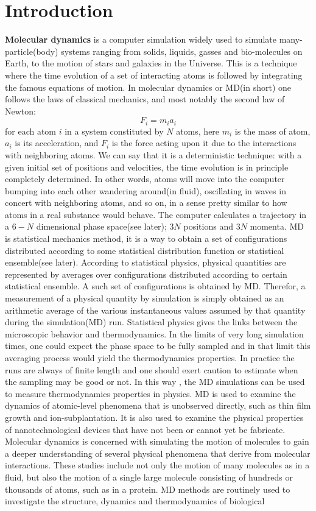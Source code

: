 \documentclass[a4paper]{article}
\begin{document}
\section{Introduction}
\textbf{Molecular dynamics} is a computer simulation widely used to simulate many-particle(body) systems ranging from solids, liquids, gasses and bio-molecules on Earth, to the motion of stars and galaxies in the Universe. This is a technique where the time evolution of a set of interacting atoms is followed by integrating the famous equations of motion. In molecular dynamics or MD(in short) one follows the laws of classical mechanics, and most notably the second law of Newton: 
\begin{equation}
F_i =m_i a_i
\end{equation}
for each atom $i$ in a system constituted by $N$ atoms, here $m_i$ is the mass of atom, $a_i$ is its acceleration, and $F_i$ is the force acting upon it due to the interactions with neighboring atoms. We can say that it is a deterministic technique: with a given initial set of positions and velocities, the time evolution is in principle completely determined. In other words, atoms will move into the computer bumping into each other wandering around(in fluid), oscillating in waves in concert with neighboring atoms, and so on, in a sense pretty similar to how atoms in a real substance would behave. The computer calculates a trajectory in a $6-N$ dimensional phase space(see later); $3N$ positions and $3N$ momenta. MD is statistical mechanics method, it is a way to obtain a set of configurations distributed according to some statistical distribution function or statistical ensemble(see later). According to statistical physics, physical quantities are represented by averages over configurations distributed according to certain statistical ensemble. A such set of configurations is obtained by MD. Therefor, a measurement of a physical quantity by simulation is simply obtained as an arithmetic average of the various instantaneous values assumed by that quantity during the simulation(MD) run. Statistical physics gives the links between the microscopic behavior and thermodynamics. In the limits of very long simulation times, one could expect the phase space to be fully sampled and in that limit this averaging process would yield the thermodynamics properties. In practice the runs are always of finite length and one should exert caution to estimate when the sampling may be good or not. In this way , the MD simulations can be used to measure thermodynamics properties in physics. MD is used to examine the dynamics of atomic-level phenomena that is unobserved directly, such as thin film growth and ion-subplantation. It is also used to examine the physical properties of nanotechnological devices that have not been or cannot yet be fabricate. Molecular dynamics is concerned with simulating the motion of molecules to gain a deeper understanding of several physical phenomena that derive from molecular interactions. These studies include not only the motion of many molecules as in a fluid, but also the motion of a single large molecule consisting of hundreds or thousands of atoms, such as in a protein. MD methods are routinely used to investigate the structure, dynamics and thermodynamics of biological 
\end{document}
